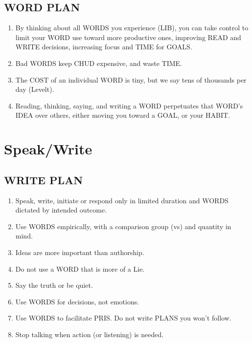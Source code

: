 \documentclass[
]{book}
\providecommand{\tightlist}{%
  \setlength{\itemsep}{0pt}\setlength{\parskip}{0pt}}
\begin{document}
\hypertarget{word-plan}{%
\subsection{WORD PLAN}\label{word-plan}}

\begin{enumerate}
\def\labelenumi{\arabic{enumi}.}
\setcounter{enumi}{25}
\tightlist
\item
  By thinking about all WORDS you experience (LIB), you can take
  control to limit your WORD use toward more productive ones,
  improving READ and WRITE decisions, increasing focus and TIME for
  GOALS.
\item
  Bad WORDS keep CHUD expensive, and waste TIME.
\item
  The COST of an individual WORD is tiny, but we say tens of thousands
  per day (Levelt).
\item
  Reading, thinking, saying, and writing a WORD perpetuates that
  WORD's IDEA over others, either moving you toward a GOAL, or your
  HABIT.
\end{enumerate}

\hypertarget{speakwrite}{%
\section{Speak/Write}\label{speakwrite}}

\hypertarget{write-plan-1}{%
\subsection{WRITE PLAN}\label{write-plan-1}}

\begin{enumerate}
\def\labelenumi{\arabic{enumi}.}
\setcounter{enumi}{29}
\tightlist
\item
  Speak, write, initiate or respond only in limited duration and WORDS
  dictated by intended outcome.
\item
  Use WORDS empirically, with a comparison group (vs) and quantity in
  mind.
\item
  Ideas are more important than authorship.
\item
  Do not use a WORD that is more of a Lie.
\item
  Say the truth or be quiet.
\item
  Use WORDS for decisions, not emotions.
\item
  Use WORDS to facilitate PRIS. Do not write PLANS you won't follow.
\item
  Stop talking when action (or listening) is needed.
\end{enumerate}
\end{document}
